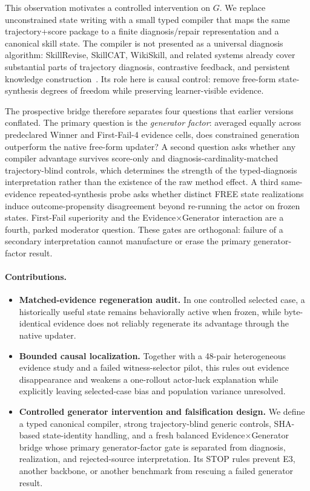 This observation motivates a controlled intervention on $G$. We replace unconstrained state writing with a small typed compiler that maps the same trajectory+score package to a finite diagnosis/repair representation and a canonical skill state. The compiler is not presented as a universal diagnosis algorithm: SkillRevise, SkillCAT, WikiSkill, and related systems already cover substantial parts of trajectory diagnosis, contrastive feedback, and persistent knowledge construction~\citep{liu2026skillrevise,chen2026skillcat,tang2026wikiskill}. Its role here is causal control: remove free-form state-synthesis degrees of freedom while preserving learner-visible evidence.

The prospective bridge therefore separates four questions that earlier versions conflated. The primary question is the \emph{generator factor}: averaged equally across predeclared Winner and First-Fail-4 evidence cells, does constrained generation outperform the native free-form updater? A second question asks whether any compiler advantage survives score-only and diagnosis-cardinality-matched trajectory-blind controls, which determines the strength of the typed-diagnosis interpretation rather than the existence of the raw method effect. A third same-evidence repeated-synthesis probe asks whether distinct FREE state realizations induce outcome-propensity disagreement beyond re-running the actor on frozen states. First-Fail superiority and the Evidence$\times$Generator interaction are a fourth, parked moderator question. These gates are orthogonal: failure of a secondary interpretation cannot manufacture or erase the primary generator-factor result.

\paragraph{Contributions.}
\begin{itemize}
    \item \textbf{Matched-evidence regeneration audit.} In one controlled selected case, a historically useful state remains behaviorally active when frozen, while byte-identical evidence does not reliably regenerate its advantage through the native updater.
    \item \textbf{Bounded causal localization.} Together with a 48-pair heterogeneous evidence study and a failed witness-selector pilot, this rules out evidence disappearance and weakens a one-rollout actor-luck explanation while explicitly leaving selected-case bias and population variance unresolved.
    \item \textbf{Controlled generator intervention and falsification design.} We define a typed canonical compiler, strong trajectory-blind generic controls, SHA-based state-identity handling, and a fresh balanced Evidence$\times$Generator bridge whose primary generator-factor gate is separated from diagnosis, realization, and rejected-source interpretation. Its STOP rules prevent E3, another backbone, or another benchmark from rescuing a failed generator result.
\end{itemize}
